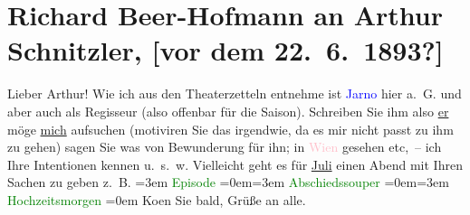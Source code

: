 

               \section[Richard Beer-Hofmann an Arthur Schnitzler, {[}vor dem 22. 6. 1893?{]}]{ Richard Beer-Hofmann an Arthur Schnitzler, {[}vor dem
               22. 6. 1893?{]}}\nopagebreak{}\rehead{ }\normalsize\beginnumbering{} \toendnotes[C]{\smallbreak\pagebreak[2]} 
\toendnotes[C]{\smallbreak}\pstart
           \noindent{}\textcolor{gray}{\textbf{\label{T_L00223-1v}\label{T_L00223-1h}}}\pend
           \pstart{}{\pb}Lieber Arthur!\pend\pstart
           Wie ich aus den Theaterzetteln entnehme ist \textcolor{blue}{Jarno}{}\ledrightnote{\textcolor{blue}{Josef Jarno}}
               hier a. G. und aber auch als Regisseur (also offenbar für die Saison). Schreiben Sie
               ihm also \uline{er} möge \uline{mich}
               aufsuchen (motiviren Sie das irgendwie, da es mir nicht passt zu ihm zu gehen) sagen
                  {\pb}Sie was von Bewunderung für
               ihn; in \textcolor{pink}{Wien}{}\ledrightnote{\textcolor{pink}{Wien}} gesehen etc, – ich Ihre Intentionen
               kennen u. s. w. Vielleicht geht es für \uline{Juli} einen Abend mit Ihren Sachen zu geben z. B.\pend
           \leftskip=3em{}\pstart
           \noindent{}\textcolor{green}{Episode}{}\ledrightnote{\textcolor{green}{Episode}}\pend
           \leftskip=0em{}\leftskip=3em{}\pstart
           \textcolor{green}{Abschiedssouper}{}\ledrightnote{\textcolor{green}{Abschiedssouper}}\pend
           \leftskip=0em{}\leftskip=3em{}\pstart
           \textcolor{green}{Hochzeitsmorgen}{}\ledrightnote{\textcolor{green}{Anatols Hochzeitsmorgen}}\pend
           \leftskip=0em{}\pstart
           \noindent{}Ko{\geminationm}en Sie bald, Grüße an alle.\pend
           \pstart
